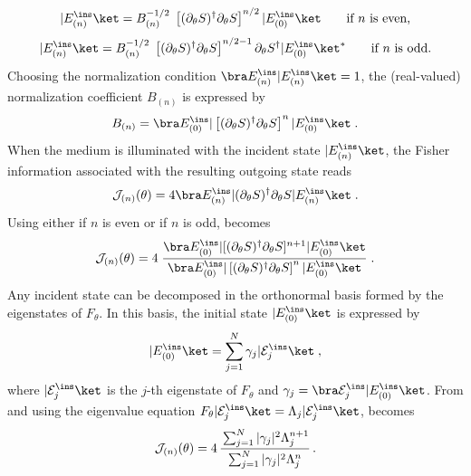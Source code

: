 \documentclass[aps,pra,twocolumn,amsmath,amssymb,superscriptaddress,10pt,nobibnotes]{revtex4-2}
\begin{document}
\begin{equation}
|E^\ins_{(n)} \ket = B_{(n)}^{-1/2} \; \left[(\partial_\theta S)^\dagger \partial_\theta S \right]^{n/2} | E^\ins_{(0)} \ket \qquad \text{if $n$ is even,}
\label{trap_even}
\end{equation}
\begin{equation}
|E^\ins_{(n)} \ket = B_{(n)}^{-1/2} \; \left[(\partial_\theta S)^\dagger \partial_\theta S \right]^{{n/2-1}} \partial_\theta S^\dagger | E^\ins_{(0)} \ket^* \qquad \text{if $n$ is odd.}
\label{trap_odd}
\end{equation}
Choosing the normalization condition $\bra E^\ins_{(n)} |E^\ins_{(n)} \ket =1$, the (real-valued) normalization coefficient $B_{(n)}$ is expressed by
\begin{equation}
B_{(n)} = \bra E^\ins_{(0)} | \left[(\partial_\theta S)^\dagger \partial_\theta S \right]^{n}  | E^\ins_{(0)} \ket \; .
\end{equation}
When the medium is illuminated with the incident state $|E^\ins_{(n)} \ket$, the Fisher information associated with the resulting outgoing state reads
\begin{equation}
\mathcal{J}_{(n)} (\theta) = 4 \bra E^\ins_{(n)} | (\partial_\theta S)^\dagger \partial_\theta S   | E^\ins_{(n)} \ket \; .
\label{trap_fisher_n}
\end{equation}
Using either  if $n$ is even or  if $n$ is odd,  becomes 
\begin{equation}
\mathcal{J}_{(n)} (\theta)= 4  \; \frac{ \bra E^\ins_{(0)} | [(\partial_\theta S)^\dagger \partial_\theta S ]^{n+1}  | E^\ins_{(0)} \ket }{\bra E^\ins_{(0)} | \left[(\partial_\theta S)^\dagger \partial_\theta S \right]^{n}  | E^\ins_{(0)} \ket} \; .
\label{trap_fisher_0}
\end{equation}
Any incident state can be decomposed in the orthonormal basis formed by the eigenstates of $F_\theta$. In this basis, the initial state $|E^\ins_{(0)} \ket$ is expressed by
\begin{equation}
|E^\ins_{(0)} \ket = \sum_{j=1}^N \gamma_j |\mathcal{E}_j^\ins\ket \; ,
\label{trap_initial}
\end{equation}
where $|\mathcal{E}^\ins_j\ket$ is the $j$-th eigenstate of $F_\theta$ and $\gamma_j=\bra  \mathcal{E}_j^\ins  |E^\ins_{(0)} \ket $. From  and using the eigenvalue equation $F_\theta |  \mathcal{E}^\ins_j \ket = \Lambda_j | \mathcal{E}^\ins_j\ket$,  becomes
\begin{equation}
\mathcal{J}_{(n)}(\theta)= 4\, \cfrac{\sum_{j=1}^N |\gamma_j|^2 \Lambda_j^{n+1}}{\sum_{j=1}^N |\gamma_j|^2 \Lambda_j^n} \; .
\label{trap_fisher}
\end{equation}
\end{document}

